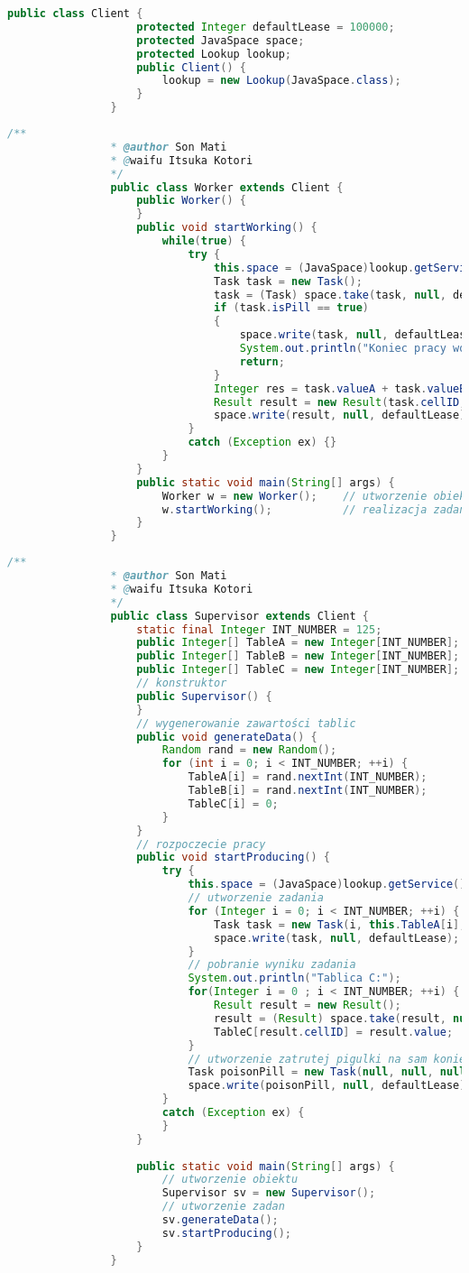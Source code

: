 			\begin{lstlisting}[language=Java]
				public class Client {
					protected Integer defaultLease = 100000;
					protected JavaSpace space;
					protected Lookup lookup;
					public Client() {
						lookup = new Lookup(JavaSpace.class);
					}
				}
			\end{lstlisting}
			\begin{lstlisting}[language=Java]
				/**
				* @author Son Mati
				* @waifu Itsuka Kotori
				*/
				public class Worker extends Client {
					public Worker() {
					}
					public void startWorking() {
						while(true) {
							try {
								this.space = (JavaSpace)lookup.getService();
								Task task = new Task();
								task = (Task) space.take(task, null, defaultLease);
								if (task.isPill == true)
								{
									space.write(task, null, defaultLease);
									System.out.println("Koniec pracy workera.");
									return;
								}
								Integer res = task.valueA + task.valueB;
								Result result = new Result(task.cellID, res);
								space.write(result, null, defaultLease);
							}
							catch (Exception ex) {}
						}
					}
					public static void main(String[] args) {
						Worker w = new Worker();	// utworzenie obiektu
						w.startWorking();			// realizacja zadan
					}
				}
			\end{lstlisting}
			\newpage
			\begin{lstlisting}[language=Java]
				/**
				* @author Son Mati
				* @waifu Itsuka Kotori
				*/
				public class Supervisor extends Client {
					static final Integer INT_NUMBER = 125;
					public Integer[] TableA = new Integer[INT_NUMBER];
					public Integer[] TableB = new Integer[INT_NUMBER];
					public Integer[] TableC = new Integer[INT_NUMBER];
					// konstruktor
					public Supervisor() {
					}
					// wygenerowanie zawartości tablic
					public void generateData() {
						Random rand = new Random();
						for (int i = 0; i < INT_NUMBER; ++i) {
							TableA[i] = rand.nextInt(INT_NUMBER);
							TableB[i] = rand.nextInt(INT_NUMBER);
							TableC[i] = 0;
						}
					}
					// rozpoczecie pracy
					public void startProducing() {
						try {
							this.space = (JavaSpace)lookup.getService();
							// utworzenie zadania
							for (Integer i = 0; i < INT_NUMBER; ++i) {
								Task task = new Task(i, this.TableA[i], this.TableB[i], false);
								space.write(task, null, defaultLease);
							}
							// pobranie wyniku zadania
							System.out.println("Tablica C:");
							for(Integer i = 0 ; i < INT_NUMBER; ++i) {
								Result result = new Result();
								result = (Result) space.take(result, null, defaultLease);
								TableC[result.cellID] = result.value;
							}
							// utworzenie zatrutej pigulki na sam koniec
							Task poisonPill = new Task(null, null, null, true);
							space.write(poisonPill, null, defaultLease);
						}
						catch (Exception ex) {
						}
					}
				
					public static void main(String[] args) {
						// utworzenie obiektu
						Supervisor sv = new Supervisor();
						// utworzenie zadan
						sv.generateData();
						sv.startProducing();
					}
				}
			\end{lstlisting}
	\newpage
